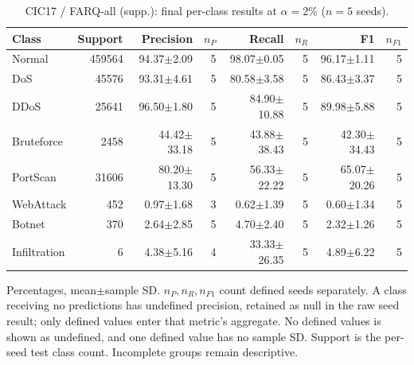 \begin{table}[t]
\centering\scriptsize
\setlength{\tabcolsep}{3.3pt}
\caption{CIC17 / FARQ-all (supp.): final per-class results at $\alpha=2\%$ ($n=5$ seeds).}\label{tab:forgetting-class-cic_ids_2017-farq-all}
\begin{tabular}{lrrrrrrr}
\toprule
Class & Support & Precision & $n_P$ & Recall & $n_R$ & F1 & $n_{F1}$ \\
\midrule
Normal & 459564 & 94.37$\pm$2.09 & 5 & 98.07$\pm$0.05 & 5 & 96.17$\pm$1.11 & 5 \\
DoS & 45576 & 93.31$\pm$4.61 & 5 & 80.58$\pm$3.58 & 5 & 86.43$\pm$3.37 & 5 \\
DDoS & 25641 & 96.50$\pm$1.80 & 5 & 84.90$\pm$10.88 & 5 & 89.98$\pm$5.88 & 5 \\
Bruteforce & 2458 & 44.42$\pm$33.18 & 5 & 43.88$\pm$38.43 & 5 & 42.30$\pm$34.43 & 5 \\
PortScan & 31606 & 80.20$\pm$13.30 & 5 & 56.33$\pm$22.22 & 5 & 65.07$\pm$20.26 & 5 \\
WebAttack & 452 & 0.97$\pm$1.68 & 3 & 0.62$\pm$1.39 & 5 & 0.60$\pm$1.34 & 5 \\
Botnet & 370 & 2.64$\pm$2.85 & 5 & 4.70$\pm$2.40 & 5 & 2.32$\pm$1.26 & 5 \\
Infiltration & 6 & 4.38$\pm$5.16 & 4 & 33.33$\pm$26.35 & 5 & 4.89$\pm$6.22 & 5 \\
\bottomrule
\end{tabular}
\par\smallskip\begin{minipage}{0.98\textwidth}\scriptsize Percentages, mean$\pm$sample SD. $n_P,n_R,n_{F1}$ count defined seeds separately. A class receiving no predictions has undefined precision, retained as null in the raw seed result; only defined values enter that metric's aggregate. No defined values is shown as undefined, and one defined value has no sample SD. Support is the per-seed test class count. Incomplete groups remain descriptive.\end{minipage}
\end{table}

